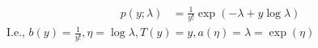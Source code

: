 \begin{answer}

$$
\begin{aligned}
p(y;\lambda)&=  \frac{1}{y!} \exp(-\lambda+y\log\lambda)
\end{aligned}
$$
I.e., 	$b(y)=\frac{1}{y!},\eta = \log\lambda, T(y)=y, a(\eta)=\lambda=\exp(\eta)$


\end{answer}

